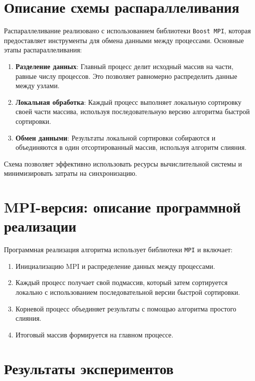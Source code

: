 \documentclass[a4paper,12pt]{article}
\begin{document}
\newpage

\section*{\centering Описание схемы распараллеливания}

Распараллеливание реализовано с использованием библиотеки \texttt{Boost MPI}, которая предоставляет инструменты для обмена данными между процессами. Основные этапы распараллеливания:
\begin{enumerate}
    \item \textbf{Разделение данных}:
    Главный процесс делит исходный массив на части, равные числу процессов. Это позволяет равномерно распределить данные между узлами.
    \item \textbf{Локальная обработка}:
    Каждый процесс выполняет локальную сортировку своей части массива, используя последовательную версию алгоритма быстрой сортировки.
    \item \textbf{Обмен данными}:
    Результаты локальной сортировки собираются и объединяются в один отсортированный массив, используя алгоритм слияния.
\end{enumerate}

Схема позволяет эффективно использовать ресурсы вычислительной системы и минимизировать затраты на синхронизацию.

\newpage

\section*{\centering MPI-версия: описание программной реализации}

Программная реализация алгоритма использует библиотеки \texttt{MPI} и включает:
\begin{enumerate}
    \item Инициализацию MPI и распределение данных между процессами.
    \item Каждый процесс получает свой подмассив, который затем сортируется локально с использованием последовательной версии быстрой сортировки.
    \item Корневой процесс объединяет результаты с помощью алгоритма простого слияния.
    \item  Итоговый массив формируется на главном процессе.
\end{enumerate}

\newpage

\section*{\centering Результаты экспериментов}
\end{document}
